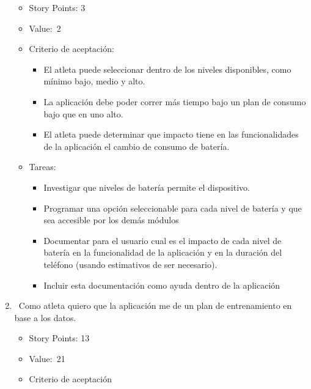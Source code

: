 \begin{enumerate}
  \begin{itemize}
  \item
    Story Points: 3
  \item
    Value:~2
  \item
    Criterio de aceptación:

    \begin{itemize}
    \itemsep1pt\parskip0pt
    \item
      El atleta puede seleccionar dentro de los niveles disponibles,
      como mínimo bajo, medio y alto.
    \item
      La aplicación debe poder correr más tiempo bajo un plan de consumo
      bajo que en uno alto.
    \item
      El atleta puede determinar que impacto tiene en las
      funcionalidades de la aplicación el cambio de consumo de batería.
    \end{itemize}
  \item
    Tareas:

    \begin{itemize}
    \itemsep1pt\parskip0pt
    \item
      Investigar que niveles de batería permite el dispositivo.
    \item
      Programar una opción seleccionable para cada nivel de batería y
      que sea accesible por los demás módulos
    \item
      Documentar para el usuario cual es el impacto de cada nivel de
      batería en la funcionalidad de la aplicación y en la duración del
      teléfono (usando estimativos de ser necesario).
    \item
      Incluir esta documentación como ayuda dentro de la aplicación
    \end{itemize}
  \end{itemize}
\item
  ~Como atleta quiero que la aplicación me de un plan de entrenamiento
  en base a los datos.

  \begin{itemize}
  \item
    Story Points: 13
  \item
    Value:~21
  \item
    Criterio de aceptación


\end{itemize}
\end{enumerate}
